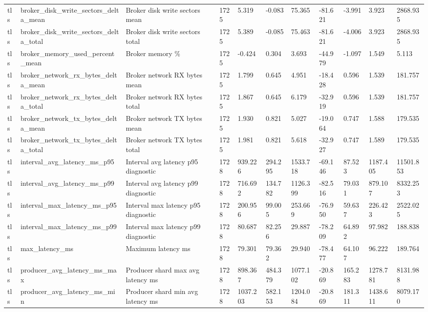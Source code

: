 \begin{longtable}{lllllllllll}
tls & broker\_disk\_write\_sectors\_delta\_mean & Broker disk write sectors mean & 1725 & 5.319 & -0.083 & 75.365 & -81.621 & -3.991 & 3.923 & 2868.935 \\
tls & broker\_disk\_write\_sectors\_delta\_total & Broker disk write sectors total & 1725 & 5.389 & -0.085 & 75.463 & -81.621 & -4.006 & 3.923 & 2868.935 \\
tls & broker\_memory\_used\_percent\_mean & Broker memory \% & 1725 & -0.424 & 0.304 & 3.693 & -44.979 & -1.097 & 1.549 & 5.113 \\
tls & broker\_network\_rx\_bytes\_delta\_mean & Broker network RX bytes mean & 1725 & 1.799 & 0.645 & 4.951 & -18.428 & 0.596 & 1.539 & 181.757 \\
tls & broker\_network\_rx\_bytes\_delta\_total & Broker network RX bytes total & 1725 & 1.867 & 0.645 & 6.179 & -32.919 & 0.596 & 1.539 & 181.757 \\
tls & broker\_network\_tx\_bytes\_delta\_mean & Broker network TX bytes mean & 1725 & 1.930 & 0.821 & 5.027 & -19.064 & 0.747 & 1.588 & 179.535 \\
tls & broker\_network\_tx\_bytes\_delta\_total & Broker network TX bytes total & 1725 & 1.981 & 0.821 & 5.618 & -32.927 & 0.747 & 1.589 & 179.535 \\
tls & interval\_avg\_latency\_ms\_p95 & Interval avg latency p95 diagnostic & 1728 & 939.226 & 294.295 & 1533.718 & -69.146 & 87.523 & 1187.405 & 11501.853 \\
tls & interval\_avg\_latency\_ms\_p99 & Interval avg latency p99 diagnostic & 1728 & 716.692 & 134.782 & 1126.399 & -82.516 & 79.031 & 879.107 & 8332.253 \\
tls & interval\_max\_latency\_ms\_p95 & Interval max latency p95 diagnostic & 1728 & 200.956 & 99.005 & 253.669 & -76.950 & 59.637 & 226.423 & 2522.025 \\
tls & interval\_max\_latency\_ms\_p99 & Interval max latency p99 diagnostic & 1728 & 80.687 & 82.256 & 29.887 & -78.209 & 64.892 & 97.982 & 188.838 \\
tls & max\_latency\_ms & Maximum latency ms & 1728 & 79.301 & 79.362 & 29.940 & -78.477 & 64.107 & 96.222 & 189.764 \\
tls & producer\_avg\_latency\_ms\_max & Producer shard max avg latency ms & 1728 & 898.367 & 484.379 & 1077.102 & -20.869 & 165.283 & 1278.781 & 8131.988 \\
tls & producer\_avg\_latency\_ms\_min & Producer shard min avg latency ms & 1728 & 1037.203 & 582.153 & 1204.084 & -20.869 & 181.311 & 1438.611 & 8079.170 \\

\end{longtable}
